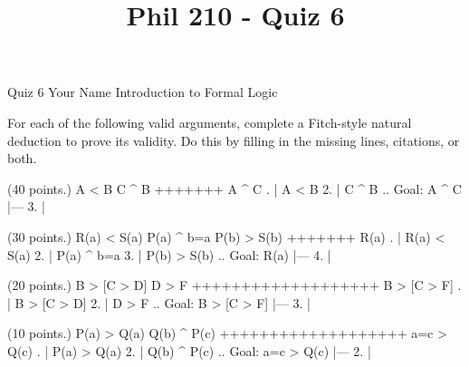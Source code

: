 
\title{Phil 210 - Quiz 6}

\heading
Quiz 6
Your Name
Introduction to Formal Logic
\endheading

For each of the following valid arguments, complete a Fitch-style natural deduction to prove its validity. Do this by filling in the missing lines, citations, or both.

\problems
{} (40 points.)
\argument
 A < B
 C ^ B
+++++++
 A ^ C
\endargument
        \answer
        . | A < B
         2. | C ^ B  ..  Goal: A ^ C
            |---
         3. | 
        \endfitchproof
        \endanswer

 (30 points.)
\argument
 R(a) < S(a)
 P(a) ^ b=a
 P(b) > S(b)
+++++++
 R(a)
\endargument
        \answer
        . | R(a) < S(a)
         2. | P(a) ^ b=a
         3. | P(b) > S(b)  ..  Goal: R(a)
            |---
         4. | 
        \endfitchproof
        \endanswer

 (20 points.)
\argument
 B > [C > D]
 D > F
+++++++++++++++++++
 B > [C > F]
\endargument
        \answer
        . | B > [C > D]
         2. | D > F        ..  Goal: B > [C > F]
            |---
         3. | 
        \endfitchproof
        \endanswer

 (10 points.)
\argument
 P(a) > Q(a)
 Q(b) ^ P(c)
+++++++++++++++++++
 a=c > Q(c)
\endargument
        \answer
        . | P(a) > Q(a)
         2. | Q(b) ^ P(c)  ..  Goal: a=c > Q(c)
            |---
         2. | 
        \endfitchproof
        \endanswer

\endproblems
\bye
